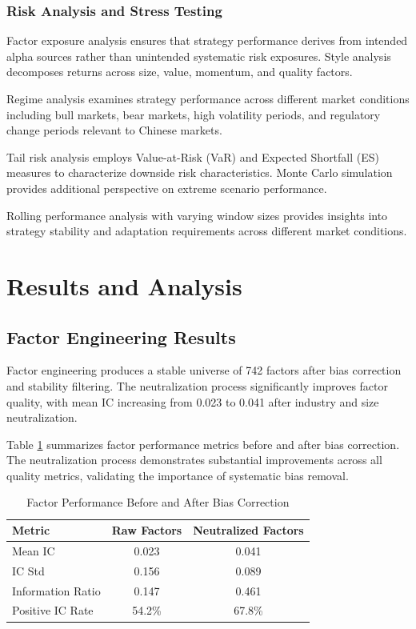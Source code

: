 \documentclass[conference]{IEEEtran}
\begin{document}
\subsubsection{Risk Analysis and Stress Testing}

Factor exposure analysis ensures that strategy performance derives from intended alpha sources rather than unintended systematic risk exposures. Style analysis decomposes returns across size, value, momentum, and quality factors.

Regime analysis examines strategy performance across different market conditions including bull markets, bear markets, high volatility periods, and regulatory change periods relevant to Chinese markets.

Tail risk analysis employs Value-at-Risk (VaR) and Expected Shortfall (ES) measures to characterize downside risk characteristics. Monte Carlo simulation provides additional perspective on extreme scenario performance.

Rolling performance analysis with varying window sizes provides insights into strategy stability and adaptation requirements across different market conditions.


\section{Results and Analysis}

\subsection{Factor Engineering Results}

Factor engineering produces a stable universe of 742 factors after bias correction and stability filtering. The neutralization process significantly improves factor quality, with mean IC increasing from 0.023 to 0.041 after industry and size neutralization.

Table \ref{tab:factor_performance} summarizes factor performance metrics before and after bias correction. The neutralization process demonstrates substantial improvements across all quality metrics, validating the importance of systematic bias removal.

\begin{table}[htbp]
\centering
\caption{Factor Performance Before and After Bias Correction}
\label{tab:factor_performance}
\begin{tabular}{lcc}
\toprule
Metric & Raw Factors & Neutralized Factors \\
\midrule
Mean IC & 0.023 & 0.041 \\
IC Std & 0.156 & 0.089 \\
Information Ratio & 0.147 & 0.461 \\
Positive IC Rate & 54.2\% & 67.8\% \\
\bottomrule
\end{tabular}
\end{table}
\end{document}
